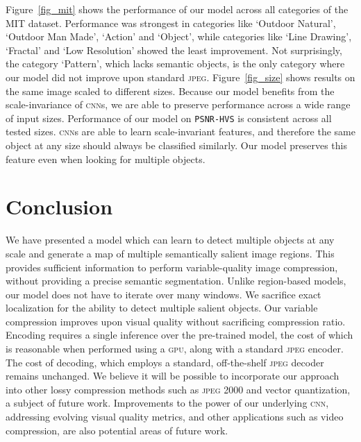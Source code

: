 Figure~\ref{fig_mit} shows the performance of our model across all categories of the MIT dataset.
Performance was strongest in categories like `Outdoor Natural', `Outdoor Man Made', `Action' and `Object', while categories like `Line Drawing', `Fractal' and `Low Resolution' showed the least improvement.
Not surprisingly, the category `Pattern', which lacks semantic objects, is the only category where our model did not improve upon standard \textsc{jpeg}.
Figure~\ref{fig_size} shows results on the same image scaled to different sizes. 
Because our model benefits from the scale-invariance of \textsc{cnn}s, we are able to preserve performance across a wide range of input sizes.
Performance of our model on \texttt{PSNR-HVS} is consistent across all tested sizes. \textsc{cnn}s are able to learn scale-invariant features, and therefore the same object at any size should always be classified similarly.
Our model preserves this feature even when looking for multiple objects.


    

\section{Conclusion}
We have presented a model which can learn to detect multiple objects at any scale and generate a map of multiple semantically salient image regions.
This provides sufficient information to perform variable-quality image compression, without providing a precise semantic segmentation.
Unlike region-based models, our model does not have to iterate over many windows.
We sacrifice exact localization for the ability to detect multiple salient objects.
Our variable compression improves upon visual quality without sacrificing compression ratio. 
Encoding requires a single inference over the pre-trained model, the cost of which is reasonable when performed using a \textsc{gpu}, along with a standard \textsc{jpeg} encoder. The cost of decoding, which employs a standard, off-the-shelf \textsc{jpeg} decoder remains unchanged.
We believe it will be possible to incorporate our approach into other lossy compression methods such as \textsc{jpeg} 2000 and vector quantization, a subject of future work.
Improvements to the power of our underlying \textsc{cnn}, addressing evolving visual quality metrics, and other applications such as video compression, are also potential areas of future work.
